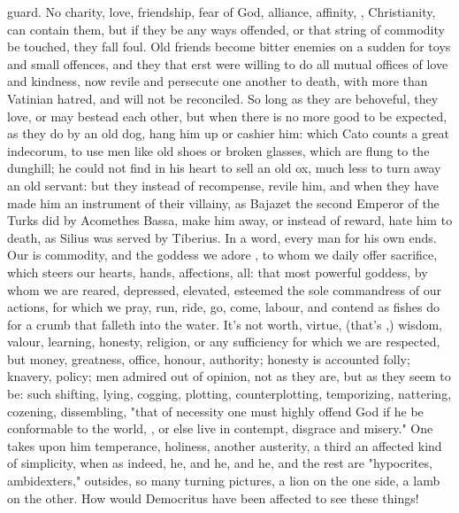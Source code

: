 guard. No charity, love, friendship, fear of God, alliance,
affinity, , Christianity, can
contain them, but if they be any ways offended, or that string of commodity be
touched, they fall foul. Old friends become bitter enemies on a sudden for toys
and small offences, and they that erst were willing to do all mutual offices of
love and kindness, now revile and persecute one another to death, with more
than Vatinian hatred, and will not be reconciled. So long as they are
behoveful, they love, or may bestead each other, but when there is no more good
to be expected, as they do by an old dog, hang him up or cashier him: which
Cato counts a great indecorum, to use men like old shoes or
broken glasses, which are flung to the dunghill; he could not find in his heart
to sell an old ox, much less to turn away an old servant: but they instead of
recompense, revile him, and when they have made him an instrument of their
villainy, as Bajazet the second Emperor of the Turks did by
Acomethes Bassa, make him away, or instead of reward, hate
him to death, as Silius was served by Tiberius. In a word, every man for his
own ends. Our  is commodity, and the goddess we adore , to whom we daily offer sacrifice, which steers our
hearts, hands, affections, all: that most powerful goddess,
by whom we are reared, depressed, elevated, esteemed the
sole commandress of our actions, for which we pray, run, ride, go, come,
labour, and contend as fishes do for a crumb that falleth into the water. It's
not worth, virtue, (that's ,) wisdom, valour, learning,
honesty, religion, or any sufficiency for which we are respected, but
money, greatness, office, honour, authority; honesty is
accounted folly; knavery, policy; men admired out of
opinion, not as they are, but as they seem to be: such shifting, lying,
cogging, plotting, counterplotting, temporizing, nattering, cozening,
dissembling, "that of necessity one must highly offend God
if he be conformable to the world, , or else live in
contempt, disgrace and misery." One takes upon him temperance, holiness,
another austerity, a third an affected kind of simplicity, when as indeed, he,
and he, and he, and the rest are "hypocrites, ambidexters,"
outsides, so many turning pictures, a lion on the one side, a lamb on the
other. How would Democritus have been affected to see these
things!

